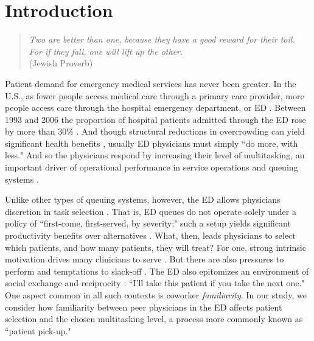 \section{Introduction} 
\begin{quote}
    \textit{Two are better than one, because they have a good reward for their toil. \\
    For if they fall, one will lift up the other.} \\
    (Jewish Proverb) %
\end{quote}

 Patient demand for emergency medical services has never been greater. In the U.S., as fewer people access medical care through a primary care provider, more people access care through the hospital emergency department, or ED \citep{Greenwood-Ericksen2019,Ganguli2020}. Between 1993 and 2006 the proportion of hospital patients admitted through the ED rose by more than 30\% \citep{Schurr2012}. And though structural reductions in overcrowding can yield significant health benefits \citep{Woodworth2019}, usually ED physicians must simply “do more, with less." And so the physicians respond by increasing their level of multitasking, an important driver of operational performance in service operations and queuing systems \citep[][]{KC2014,KC2020_productivity}.
 
 Unlike other types of queuing systems, however, the ED allows physicians discretion in task selection \citep{KC2020_tcp}. That is, ED queues do not operate solely under a policy of “first-come, first-served, by severity;" such a setup yields significant productivity benefits over alternatives \citep{Chan2016}. What, then, leads physicians to select which patients, and how many patients, they will treat? For one, strong intrinsic motivation drives many clinicians to serve \citep{Madara2015}. But there are also pressures to perform \citep{Mas2009} and temptations to slack-off \citep{Karau1993}. The ED also epitomizes an environment of social exchange \citep{Homans1961,Blau1964} and reciprocity \citep{Gouldner1960}: “I'll take this patient if you take the next one." One aspect common in all such contexts is coworker \textit{familiarity}. In our study, we consider how familiarity between peer physicians in the ED affects patient selection and the chosen multitasking level, a process more commonly known as “patient pick-up."
 
